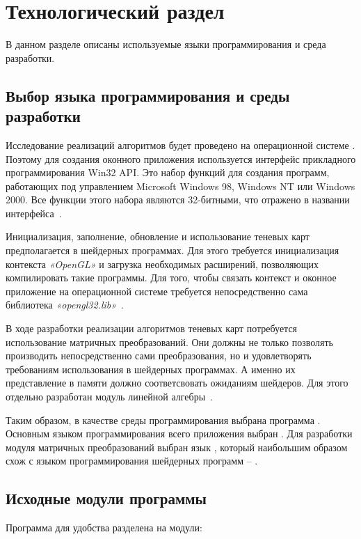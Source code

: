 \chapter{Технологический раздел}

В данном разделе описаны используемые языки программирования и среда
разработки.

\section{Выбор языка программирования и среды разработки}

Исследование реализаций алгоритмов будет проведено на операционной системе
. Поэтому для создания оконного приложения используется
интерфейс прикладного программирования Win32 API. Это набор функций
для создания программ, работающих под управлением Microsoft Windows 98,
Windows NT или Windows 2000. Все функции этого набора являются 32-битными,
что отражено в названии интерфейса~\cite{Win32Api_Shupak}.

Инициализация, заполнение, обновление и использование теневых карт
предполагается в шейдерных программах. Для этого требуется инициализация
контекста \textit{«OpenGL»} и загрузка необходимых расширений, 
позволяющих компилировать такие программы. Для того,
чтобы связать контекст и оконное приложение на операционной системе
 требуется непосредственно сама библиотека
\textit{«opengl32.lib»}~\cite{extOpenGL}.

В ходе разработки реализации алгоритмов теневых карт потребуется
использование матричных преобразований. Они должны не только позволять
производить непосредственно сами преобразования, но и удовлетворять
требованиям использования в шейдерных программах. А именно их представление
в памяти должно соответсвовать ожиданиям шейдеров. Для этого отдельно
разработан модуль линейной алгебры~\cite{Linal}.

Таким образом, в качестве среды программирования выбрана программа
. Основным языком программирования всего приложения
выбран . Для разработки модуля матричных преобразований выбран язык
, который наибольшим образом схож с языком программирования шейдерных
программ -- .

\section{Исходные модули программы}

Программа для удобства разделена на модули:

